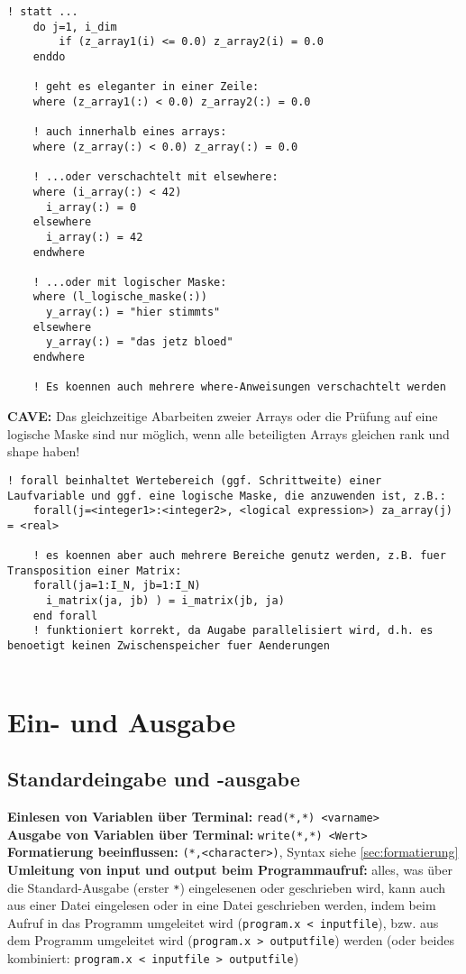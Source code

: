 \documentclass[a4paper, twocolumn]{scrarticle}
\begin{document}
\begin{lstlisting}[caption={\bfseries where-Statement als Ersatz für do-if in Feldern},language=Fortran95Konkret]
	! statt ...
	do j=1, i_dim
		if (z_array1(i) <= 0.0) z_array2(i) = 0.0
	enddo
	
	! geht es eleganter in einer Zeile:
	where (z_array1(:) < 0.0) z_array2(:) = 0.0
	
	! auch innerhalb eines arrays:
	where (z_array(:) < 0.0) z_array(:) = 0.0
	
	! ...oder verschachtelt mit elsewhere:
	where (i_array(:) < 42)
	  i_array(:) = 0
	elsewhere
	  i_array(:) = 42
	endwhere
	
	! ...oder mit logischer Maske:
	where (l_logische_maske(:))
	  y_array(:) = "hier stimmts"
	elsewhere
	  y_array(:) = "das jetz bloed"
	endwhere
	
	! Es koennen auch mehrere where-Anweisungen verschachtelt werden
\end{lstlisting}
\textbf{CAVE:} Das gleichzeitige Abarbeiten zweier Arrays oder die Prüfung auf eine logische Maske sind nur möglich, wenn alle beteiligten Arrays gleichen rank und shape haben!
\begin{lstlisting}[caption={forall-Statement als Parallelisierung von where}]
	! forall beinhaltet Wertebereich (ggf. Schrittweite) einer Laufvariable und ggf. eine logische Maske, die anzuwenden ist, z.B.:
	forall(j=<integer1>:<integer2>, <logical expression>) za_array(j) = <real>
	
	! es koennen aber auch mehrere Bereiche genutz werden, z.B. fuer Transposition einer Matrix:
	forall(ja=1:I_N, jb=1:I_N)
	  i_matrix(ja, jb) ) = i_matrix(jb, ja)
	end forall
	! funktioniert korrekt, da Augabe parallelisiert wird, d.h. es benoetigt keinen Zwischenspeicher fuer Aenderungen
	
\end{lstlisting}

\section{Ein- und Ausgabe}
\subsection{Standardeingabe und -ausgabe}
\textbf{Einlesen von Variablen über Terminal:} \lstinline|read(*,*) <varname>|\\
\textbf{Ausgabe von Variablen über Terminal:} \lstinline|write(*,*) <Wert>|\\
\textbf{Formatierung beeinflussen:} \lstinline|(*,<character>)|, Syntax siehe \cref{sec:formatierung}\\
\textbf{Umleitung von input und output beim Programmaufruf:} alles, was über die Standard-Ausgabe (erster \lstinline|*|) eingelesenen oder geschrieben wird, kann auch aus einer Datei eingelesen oder in eine Datei geschrieben werden, indem beim Aufruf in das Programm umgeleitet wird (\lstinline[style=neutral]|program.x < inputfile|), bzw. aus dem Programm umgeleitet wird (\lstinline[style=neutral]|program.x > outputfile|) werden (oder beides kombiniert: \lstinline[style=neutral]|program.x < inputfile > outputfile|)
\end{document}
